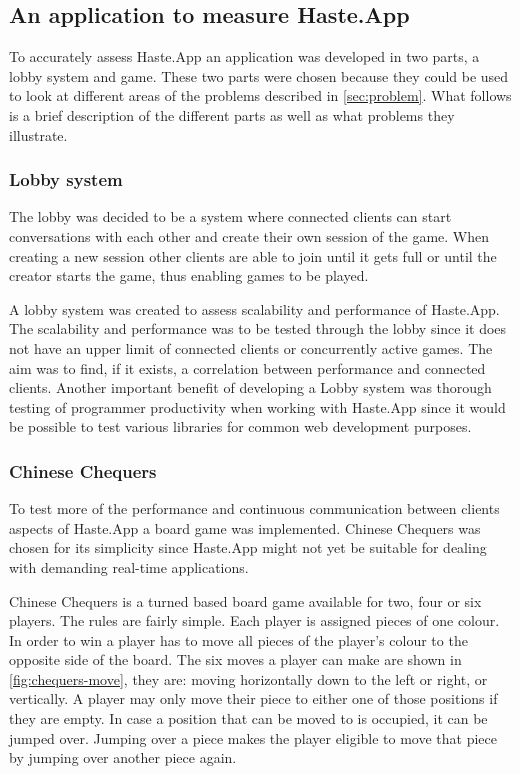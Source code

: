 \documentclass[a4paper]{article}
\begin{document}
\subsection{An application to measure Haste.App}
To accurately assess Haste.App an application was developed in two parts, a lobby system and game. These two parts were chosen because they could be used to look at different areas of the problems described in \cref{sec:problem}. What follows is a brief description of the different parts as well as what problems they illustrate.

\subsubsection{Lobby system}
The lobby was decided to be a system where connected clients can start conversations with each other and create their own session of the game. When creating a new session other clients are able to join until it gets full or until the creator starts the game, thus enabling games to be played. 

A lobby system was created to assess scalability and performance of Haste.App. The scalability and performance was to be tested through the lobby since it does not have an upper limit of connected clients or concurrently active games. The aim was to find, if it exists, a correlation between performance and connected clients. Another important benefit of developing a Lobby system was thorough testing of programmer productivity when working with Haste.App since it would be possible to test various libraries for common web development purposes.

\subsubsection{Chinese Chequers}
\label{sub:chinesecheckers}
To test more of the performance and continuous communication between clients aspects of Haste.App a board game was implemented. Chinese Chequers was chosen for its simplicity since Haste.App might not yet be suitable for dealing with demanding real-time applications.

Chinese Chequers is a turned based board game available for two, four or six players. The rules are fairly simple. Each player is assigned pieces of one colour. In order to win a player has to move all pieces of the player's colour to the opposite side of the board. The six moves a player can make are shown in \cref{fig:chequers-move}, they are: moving horizontally down to the left or right, or vertically. A player may only move their piece to either one of those positions if they are empty. In case a position that can be moved to is occupied, it can be jumped over. Jumping over a piece makes the player eligible to move that piece by jumping over another piece again.
\end{document}
